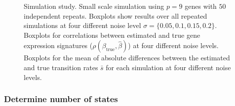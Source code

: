 \begin{figure}
  \centering
  \caption{Simulation study. Small scale simulation using $p=9$ genes with $50$ independent repeats. Boxplots show results over all repeated simulations at four different noise level $\sigma = \lbrace 0.05, 0.1, 0.15, 0.2 \rbrace $.  Boxplots for correlations between estimated and true gene expression signatures ($\rho(\beta_{\mathrm{true}},\hat{\beta})$) at four different noise levels.  Boxplots for the mean of absolute differences between the estimated and true transition rates $\bar{s}$ for each simulation at four different noise levels. }
  \label{fig:small-scale-50}
\end{figure}

\subsubsection{Determine number of states}
\label{sec:determ-numb-stat}

